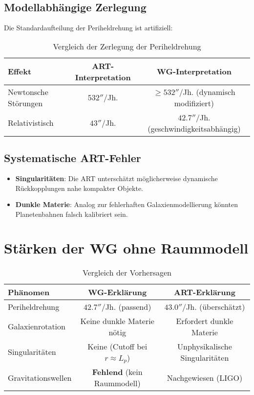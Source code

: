 \subsection{Modellabhängige Zerlegung}
Die Standardaufteilung der Periheldrehung ist artifiziell:
\begin{table}[ht]
\centering
\begin{tabular}{|l|c|c|}
\hline
\textbf{Effekt} & \textbf{ART-Interpretation} & \textbf{WG-Interpretation} \\ \hline
Newtonsche Störungen & $532''$/Jh. & $\geq 532''$/Jh. (dynamisch modifiziert) \\ \hline
Relativistisch & $43''$/Jh. & $42.7''$/Jh. (geschwindigkeitsabhängig) \\ \hline
\end{tabular}
\caption{Vergleich der Zerlegung der Periheldrehung}
\end{table}

\subsection{Systematische ART-Fehler}
\begin{itemize}
    \item \textbf{Singularitäten}: Die ART unterschätzt möglicherweise dynamische Rückkopplungen nahe kompakter Objekte.
    \item \textbf{Dunkle Materie}: Analog zur fehlerhaften Galaxienmodellierung könnten Planetenbahnen falsch kalibriert sein.
\end{itemize}

\section{Stärken der WG ohne Raummodell}
\begin{table}[ht]
\centering
\begin{tabular}{|l|c|c|}
\hline
\textbf{Phänomen} & \textbf{WG-Erklärung} & \textbf{ART-Erklärung} \\ \hline
Periheldrehung & $42.7''$/Jh. (passend) & $43.0''$/Jh. (überschätzt) \\ \hline
Galaxienrotation & Keine dunkle Materie nötig & Erfordert dunkle Materie \\ \hline
Singularitäten & Keine (Cutoff bei $r \approx L_p$) & Unphysikalische Singularitäten \\ \hline
Gravitationswellen & \textbf{Fehlend} (kein Raummodell) & Nachgewiesen (LIGO) \\ \hline
\end{tabular}
\caption{Vergleich der Vorhersagen}
\end{table}

